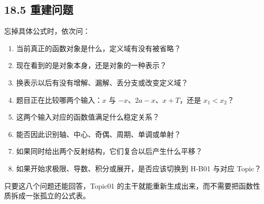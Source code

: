 \documentclass[11pt,a4paper]{ctexart}
\providecommand{\tightlist}{}
\begin{document}
\subsection{18.5 重建问题}\label{ux91cdux5efaux95eeux9898}

忘掉具体公式时，依次问：

\begin{enumerate}
\def\labelenumi{\arabic{enumi}.}
\tightlist
\item
  当前真正的函数对象是什么，定义域有没有被省略？
\item
  现在看到的是对象本身，还是对象的一种表示？
\item
  换表示以后有没有增解、漏解、丢分支或改变定义域？
\item
  题目正在比较哪两个输入：\(x\) 与 \(-x\)、\(2a-x\)、\(x+T\)，还是
  \(x_1<x_2\)？
\item
  这两个输入对应的函数值满足什么稳定关系？
\item
  能否因此识别轴、中心、奇偶、周期、单调或单射？
\item
  如果同时给出两个反射结构，它们复合以后产生什么平移？
\item
  如果开始求极限、导数、积分或展开，是否应该切换到 H-B01 与对应 Topic？
\end{enumerate}

只要这八个问题还能回答，Topic01
 的主干就能重新生成出来，而不需要把函数性质拆成一张孤立的公式表。
\end{document}
